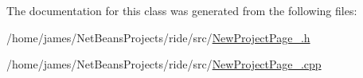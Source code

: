 The documentation for this class was generated from the following files\-:\begin{DoxyCompactItemize}
\item 
/home/james/\-Net\-Beans\-Projects/ride/src/\hyperlink{_new_project_page__2_8h}{New\-Project\-Page\-\_.\-h}\item 
/home/james/\-Net\-Beans\-Projects/ride/src/\hyperlink{_new_project_page__2_8cpp}{New\-Project\-Page\-\_.\-cpp}\end{DoxyCompactItemize}
